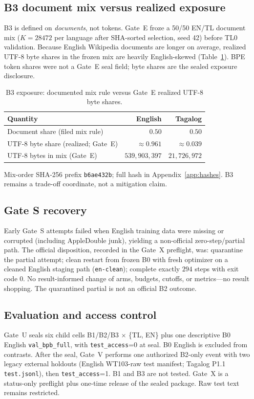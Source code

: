 \documentclass[11pt,a4paper]{article}
\begin{document}
\subsection{B3 document mix versus realized exposure}
B3 is defined on \emph{documents}, not tokens. Gate~E froze a 50/50 EN/TL document mix ($K=28472$ per language after SHA-sorted selection, seed 42) before TL0 validation. Because English Wikipedia documents are longer on average, realized UTF-8 byte shares in the frozen mix are heavily English-skewed (Table~\ref{tab:b3exp}). BPE token shares were not a Gate~E seal field; byte shares are the sealed exposure disclosure.

\begin{table}[ht]
\centering
\caption{B3 exposure: documented mix rule versus Gate~E realized UTF-8 byte shares.}
\label{tab:b3exp}
\begin{tabular}{lrr}
\toprule
Quantity & English & Tagalog \\
\midrule
Document share (filed mix rule) & $0.50$ & $0.50$ \\
UTF-8 byte share (realized; Gate~E) & $\approx 0.961$ & $\approx 0.039$ \\
UTF-8 bytes in mix (Gate~E) & $539{,}903{,}397$ & $21{,}726{,}972$ \\
\bottomrule
\end{tabular}
\end{table}
\noindent Mix-order SHA-256 prefix \texttt{b6ae432b}; full hash in Appendix~\ref{app:hashes}. B3 remains a trade-off coordinate, not a mitigation claim.

\subsection{Gate S recovery}
Early Gate~S attempts failed when English training data were missing or corrupted (including AppleDouble junk), yielding a non-official zero-step/partial path. The official disposition, recorded in the Gate~X preflight, was: quarantine the partial attempt; clean restart from frozen B0 with fresh optimizer on a cleaned English staging path (\texttt{en-clean}); complete exactly $294$ steps with exit code 0. No result-informed change of arms, budgets, cutoffs, or metrics---no result shopping. The quarantined partial is not an official B2 outcome.

\subsection{Evaluation and access control}
Gate~U seals six child cells B1/B2/B3 $\times$ \{TL, EN\} plus one descriptive B0 English \texttt{val\_bpb\_full}, with \texttt{test\_access}=0 at seal. B0 English is excluded from contrasts. After the seal, Gate~V performs one authorized B2-only event with two legacy external holdouts (English WT103-raw test manifest; Tagalog P1.1 \texttt{test.jsonl}), then \texttt{test\_access}=1. B1 and B3 are not tested. Gate~X is a status-only preflight plus one-time release of the sealed package. Raw test text remains restricted.
\end{document}
